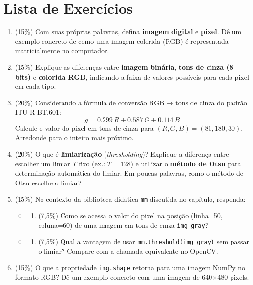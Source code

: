 \documentclass[
  portuguese,
  letterpaper,
  openany,
  oneside,
  12pt,
  a4paper]{book}
\providecommand{\tightlist}{%
  \setlength{\itemsep}{0pt}\setlength{\parskip}{0pt}}
\begin{document}
\section{Lista de Exercícios}\label{lista-de-exercuxedcios}

\begin{enumerate}
\def\labelenumi{\arabic{enumi}.}
\item
  (15\%) Com suas próprias palavras, defina \textbf{imagem digital} e
  \textbf{pixel}. Dê um exemplo concreto de como uma imagem colorida
  (RGB) é representada matricialmente no computador.
\item
  (15\%) Explique as diferenças entre \textbf{imagem binária},
  \textbf{tons de cinza (8 bits)} e \textbf{colorida RGB}, indicando a
  faixa de valores possíveis para cada pixel em cada tipo.
\item
  (20\%) Considerando a fórmula de conversão RGB → tons de cinza do
  padrão ITU‑R BT.601: \[g = 0.299\,R + 0.587\,G + 0.114\,B\] Calcule o
  valor do pixel em tons de cinza para \((R,G,B) = (80, 180, 30)\).
  Arredonde para o inteiro mais próximo.
\item
  (20\%) O que é \textbf{limiarização} (\emph{thresholding})? Explique a
  diferença entre escolher um limiar \(T\) fixo (ex.: \(T=128\)) e
  utilizar o \textbf{método de Otsu} para determinação automática do
  limiar. Em poucas palavras, como o método de Otsu escolhe o limiar?
\item
  (15\%) No contexto da biblioteca didática \texttt{mm} discutida no
  capítulo, responda:

  \begin{itemize}
  \tightlist
  \item
    \begin{enumerate}
    \def\labelenumii{\alph{enumii})}
    \tightlist
    \item
      (7,5\%) Como se acessa o valor do pixel na posição (linha=50,
      coluna=60) de uma imagem em tons de cinza \texttt{img\_gray}?
    \end{enumerate}
  \item
    \begin{enumerate}
    \def\labelenumii{\alph{enumii})}
    \setcounter{enumii}{1}
    \tightlist
    \item
      (7,5\%) Qual a vantagem de usar \texttt{mm.threshold(img\_gray)}
      sem passar o limiar? Compare com a chamada equivalente no OpenCV.
    \end{enumerate}
  \end{itemize}
\item
  (15\%) O que a propriedade \texttt{img.shape} retorna para uma imagem
  NumPy no formato RGB? Dê um exemplo concreto com uma imagem de 640×480
  pixels.
\end{enumerate}
\end{document}
